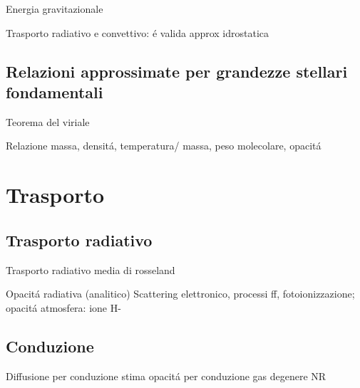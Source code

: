 \begin{frame}{Energia gravitazionale}

\end{frame}

\begin{frame}{Trasporto radiativo e convettivo: \'e valida approx idrostatica}

\end{frame}

\subsection{Relazioni approssimate per grandezze stellari fondamentali}

\begin{frame}{Teorema del viriale}

\end{frame}

\begin{frame}{Relazione massa, densit\'a, temperatura/ massa, peso molecolare, opacit\'a}

\end{frame}

\section{Trasporto}

\subsection{Trasporto radiativo}

\begin{frame}{Trasporto radiativo}
media di rosseland
\end{frame}

\begin{frame}{Opacit\'a radiativa (analitico)}
Scattering elettronico, processi ff, fotoionizzazione; opacit\'a atmosfera: ione H-
\end{frame}

\subsection{Conduzione}

\begin{frame}{Diffusione per conduzione}
stima opacit\'a per conduzione gas degenere NR
\end{frame}

